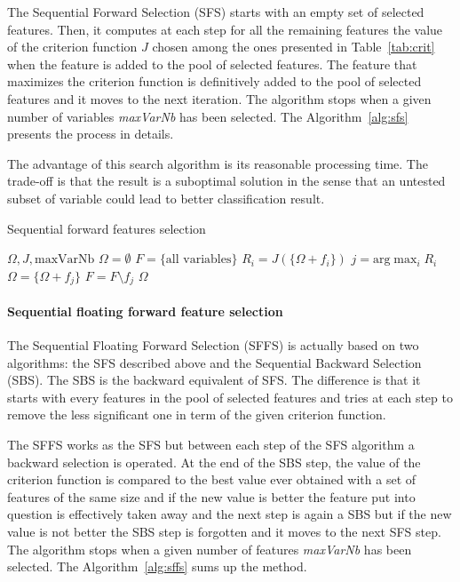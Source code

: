 \documentclass[journal,peerreview,onecolumn]{IEEEtran}
\begin{document}
            The Sequential Forward Selection (SFS) starts with an empty set of selected features. Then, it computes at each step for all the remaining features the value of the criterion function $J$ chosen among the ones presented in Table~\ref{tab:crit} when the feature is added to the pool of selected features. The feature that maximizes the criterion function is definitively added to the pool of selected features and it moves to the next iteration. The algorithm stops when a given number of variables \emph{maxVarNb} has been selected. The Algorithm~\ref{alg:sfs} presents the process in details.

            The advantage of this search algorithm is its reasonable processing time. The trade-off is that the result is a suboptimal solution in the sense that an untested subset of variable could lead to better classification result.

            \begin{algorithm}
            \caption{Sequential forward features selection\label{alg:sfs}}
            {\footnotesize
            \begin{algorithmic}[1]
            \REQUIRE $\Omega,J,\text{maxVarNb}$
            \STATE $\Omega=\emptyset$
            \STATE $F=\text{\{all variables\}}$
            \STATE $R_i = J(\{\Omega + f_i\})$
            \ENDFOR
            \STATE $j=\text{arg} \max_{i} R_i$
            \STATE $\Omega = \{\Omega + f_j\}$
            \STATE $F = F \setminus f_j$
            \ENDWHILE
            \RETURN $\Omega$
            \end{algorithmic}
            }
            \end{algorithm}

            \paragraph{Sequential floating forward feature selection}
            \label{sec:floating-presentation}

            The Sequential Floating Forward Selection (SFFS) is actually based on two algorithms: the SFS described above and the Sequential Backward Selection (SBS). The SBS is the backward equivalent of SFS. The difference is that it starts with every features in the pool of selected features and tries at each step to remove the less significant one in term of the given criterion function.

            The SFFS works as the SFS but between each step of the SFS algorithm a backward selection is operated. At the end of the SBS step, the value of the criterion function is compared to the best value ever obtained with a set of features of the same size and if the new value is better the feature put into question is effectively taken away and the next step is again a SBS but if the new value is not better the SBS step is forgotten and it moves to the next SFS step. The algorithm stops when a given number of features \emph{maxVarNb} has been selected. The Algorithm~\ref{alg:sffs} sums up the method.
\end{document}
